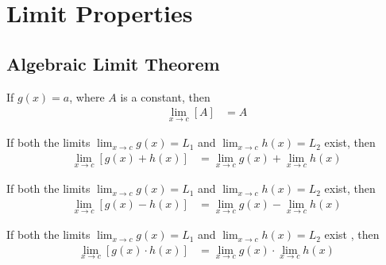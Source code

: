\documentclass[20150903-160354-rs2.2-MarksMathNotebook.tex]{subfiles}
\begin{document}
%
%

\chapter{Limit Properties}

\section{Algebraic Limit Theorem}

\begin{arule}
If $g(x)=a$, where $A$ is a constant, then
\begin{align}
	\displaystyle \lim_{x \to c} \left[ A \right] &= A\label{eq:altc}
\end{align}
\end{arule}

\begin{arule}
If both the limits $\displaystyle \lim_{x \to c} g(x)=L_1$ and $\displaystyle \lim_{x \to c} h(x)=L_2$ exist, then
\begin{align}
	\displaystyle \lim_{x \to c} \left[ g(x)+h(x) \right] &= \displaystyle \lim_{x \to c} g(x)+ \displaystyle \lim_{x \to c} h(x)\label{eq:alts} 
\end{align}
\end{arule}

\begin{arule}
If both the limits $\displaystyle \lim_{x \to c} g(x)=L_1$ and $\displaystyle \lim_{x \to c} h(x)=L_2$ exist, then
\begin{align}
	\displaystyle \lim_{x \to c} \left[ g(x)-h(x) \right] &= \displaystyle \lim_{x \to c} g(x)- \displaystyle \lim_{x \to c} h(x)\label{eq:alts} 
\end{align}
\end{arule}

\begin{arule}
If both the limits $\displaystyle \lim_{x \to c} g(x)=L_1$ and $\displaystyle \lim_{x \to c} h(x)=L_2$ exist , then
\begin{align}
	\displaystyle \lim_{x \to c} \left[ g(x) \cdot h(x) \right] &= \displaystyle \lim_{x \to c} g(x) \cdot \displaystyle \lim_{x \to c} h(x)\label{eq:altpr} 
\end{align}
\end{arule}
\end{document}
